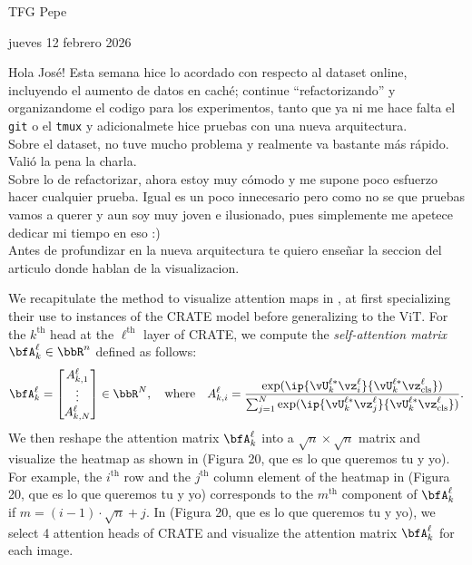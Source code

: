 \documentclass{article}
\newcommand{\ours}{CRATE}  %
\begin{document}
{\centering \textsf{TFG Pepe}\par}

\vspace{0.5in}

{\huge jueves 12 febrero 2026}

\vspace{0.5in}

Hola José!
Esta semana hice lo acordado con respecto al dataset online, incluyendo el aumento de datos en caché; continue ``refactorizando'' y organizandome el codigo para los experimentos, tanto que ya ni me hace falta el \texttt{git} o el \texttt{tmux} y adicionalmete hice pruebas con una nueva arquitectura.  \\
Sobre el dataset, no tuve mucho problema y realmente va bastante más rápido. Valió la pena la charla. \\
Sobre lo de refactorizar, ahora estoy muy cómodo y me supone poco esfuerzo hacer cualquier prueba. Igual es un poco innecesario pero como no se que pruebas vamos a querer y aun soy muy joven e ilusionado, pues simplemente me apetece dedicar mi tiempo en eso :) \\
Antes de profundizar en la nueva arquitectura te quiero enseñar la seccion del articulo donde hablan de la visualizacion.

\vspace{0.5in}

We recapitulate the method to visualize attention maps in \citet{abnar2020quantifying, caron2021emerging}, at first specializing their use to instances of the \ours{} model before generalizing to the ViT.
\noindent
For the $k^{\mathrm{th}}$ head at the $\ell^{\mathrm{th}}$ layer of \ours{}, we compute the \textit{self-attention matrix} $\bfA_{k}^{\ell}\in\bbR^{n}$ defined as follows:
\begin{equation}\label{eq:def_attention_map_crate}
   \bfA_{k}^{\ell}= \begin{bmatrix} A_{k, 1}^{\ell} \\ \vdots \\ A_{k, N}^{\ell} \end{bmatrix} \in \bbR^{N}, \quad \text{where} \quad A_{k, i}^{\ell} = \frac{\exp(\ip{\vU^{\ell*}_k\vz^{\ell}_{i}}{\vU^{\ell*}_k\vz^{\ell}_{\mathrm{cls}}})}{\sum_{j=1}^{N}\exp(\ip{\vU^{\ell*}_k\vz^{\ell}_{j}}{\vU^{\ell*}_k\vz^{\ell}_{\mathrm{cls}}})}.
\end{equation}
We then reshape the attention matrix $\bfA_{k}^{\ell}$ into a ${\sqrt{n}\times\sqrt{n}}$ matrix and visualize the heatmap as shown in (Figura 20, que es lo que queremos tu y yo).
For example, the $i^{\mathrm{th}}$ row and the $j^{\mathrm{th}}$ column element of the heatmap in (Figura 20, que es lo que queremos tu y yo) corresponds to the $m^{\mathrm{th}}$ component of $\bfA_{k}^{\ell}$ if $m=(i - 1)\cdot \sqrt{n} + j$.
In (Figura 20, que es lo que queremos tu y yo), we select 4 attention heads of \ours{} and visualize the attention matrix $\bfA_{k}^{\ell}$ for each image.
\end{document}
